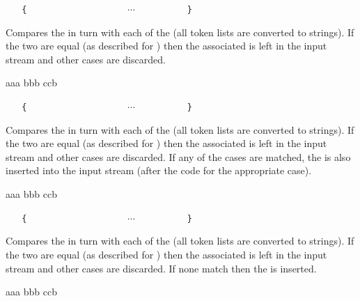 \documentclass[oneside]{book}
\begin{document}
\begin{function}{\strCase}
\begin{syntax}
 
~ ~ \verb|{|
~ ~ ~ ~  
~ ~ ~ ~  
~ ~ ~ ~ $\cdots$
~ ~ ~ ~  
~ ~ \verb|}|
\end{syntax}
Compares the  in turn with each
of the  (all token lists are converted to strings).
If the two are equal (as described for
) then the associated  is left in the
input stream and other cases are discarded.
\begin{demohigh}
\IgnoreSpacesOn
{} {
  {aaa} {}
  {bbb} {}
  {ccb} {}
}
\IgnoreSpacesOff
\end{demohigh}
\end{function}

\begin{function}{\strCaseT}
\begin{syntax}
 
~ ~ \verb|{|
~ ~ ~ ~  
~ ~ ~ ~  
~ ~ ~ ~ $\cdots$
~ ~ ~ ~  
~ ~ \verb|}|
~ ~ 
\end{syntax}
Compares the  in turn with each
of the  (all token lists are converted to strings).
If the two are equal (as described for
) then the associated  is left in the
input stream and other cases are discarded. If any of the
cases are matched, the  is also inserted into the
input stream (after the code for the appropriate case).
\begin{demohigh}
\IgnoreSpacesOn
{} {
  {aaa} {\tlSet{}}
  {bbb} {\tlSet{}}
  {ccb} {\tlSet{}}
}{
  \prgReturn{\tlUse\lTmpkTl}
}
\IgnoreSpacesOff
\end{demohigh}
\end{function}

\begin{function}{\strCaseF}
\begin{syntax}
 
~ ~ \verb|{|
~ ~ ~ ~  
~ ~ ~ ~  
~ ~ ~ ~ $\cdots$
~ ~ ~ ~  
~ ~ \verb|}|
~ ~ 
\end{syntax}
Compares the  in turn with each
of the  (all token lists are converted to strings).
If the two are equal (as described for
) then the associated  is left in the
input stream and other cases are discarded. If none
match then the  is inserted.
\begin{demohigh}
\IgnoreSpacesOn
{} {
  {aaa} {}
  {bbb} {}
  {ccb} {}
}{
}
\IgnoreSpacesOff
\end{demohigh}
\end{function}
\end{document}
